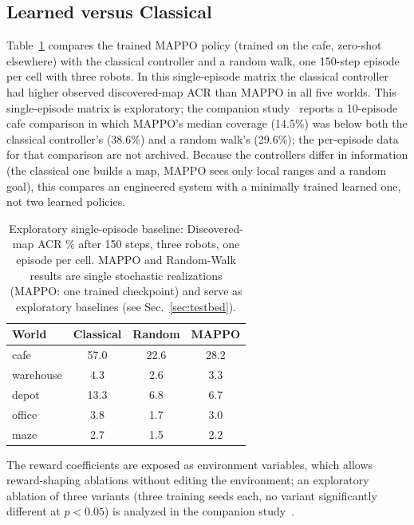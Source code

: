 \documentclass[conference]{IEEEtran}
\begin{document}
\subsection{Learned versus Classical}
Table~\ref{tab:mx} compares the trained MAPPO policy (trained on the cafe,
zero-shot elsewhere) with the classical controller and a random walk, one
150-step episode per cell with three robots. In this single-episode matrix the classical controller had higher observed discovered-map ACR than MAPPO in all five worlds. This single-episode matrix is exploratory;
the companion study~\cite{pandhe2026mappo} reports a 10-episode cafe
comparison in which MAPPO's median coverage (14.5\%) was below both the
classical controller's (38.6\%) and a random walk's (29.6\%); the
per-episode data for that comparison are not archived.
Because the controllers differ in information (the classical one builds a map,
MAPPO sees only local ranges and a random goal), this compares an engineered
system with a minimally trained learned one, not two learned policies.

\begin{table}[t]
\centering
\caption{Exploratory single-episode baseline: Discovered-map ACR \% after 150 steps, three robots, one episode per cell. MAPPO and Random-Walk results are single stochastic realizations (MAPPO: one trained checkpoint) and serve as exploratory baselines (see Sec.~\ref{sec:testbed}).}
\label{tab:mx}
\footnotesize
\begin{tabular}{@{}lccc@{}}
\toprule
World & Classical & Random & MAPPO \\
\midrule
cafe & 57.0 & 22.6 & 28.2 \\
warehouse & 4.3 & 2.6 & 3.3 \\
depot & 13.3 & 6.8 & 6.7 \\
office & 3.8 & 1.7 & 3.0 \\
maze & 2.7 & 1.5 & 2.2 \\
\bottomrule
\end{tabular}
\end{table}

The reward coefficients are exposed as environment variables, which allows reward-shaping ablations without editing the environment; an exploratory ablation of three variants (three training seeds each, no variant significantly different at $p<0.05$) is analyzed in the companion study~\cite{pandhe2026mappo}.
\end{document}
